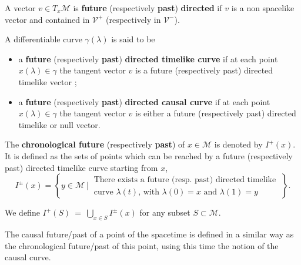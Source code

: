 \documentclass[11pt]{book}
\newcommand{\Mcal}{\mathcal{M}}
\newcommand{\Vcal}{\mathcal{V}}
\theoremstyle{break}
\newtheorem{definition}{Definition}[chapter]
\begin{document}
A vector $v \in T_x\Mcal$ is \textbf{future} (respectively \textbf{past}) \textbf{directed} if $v$ is a non spacelike vector and contained in $\Vcal^+$ (respectively in $\Vcal^-$). 




A differentiable curve $\gamma(\lambda)$ is said to be 
\begin{itemize}
\item a \textbf{future} (respectively \textbf{past}) \textbf{directed timelike curve} if at each point $x(\lambda) \in \gamma$ the tangent vector $v$ is a future (respectively past) directed timelike vector ;
\item a \textbf{future} (respectively \textbf{past}) \textbf{directed causal curve} if at each point $x(\lambda) \in \gamma$ the tangent vector $v$ is either a future (respectively past) directed timelike or null vector. 
\end{itemize}


The \textbf{chronological future} (respectively \textbf{past}) of $x \in \Mcal$ is denoted by $I^{+}(x)$. It is defined as the sets of points which can be reached by a future (respectively past) directed timelike curve starting from $x$,
%
\begin{equation*}
I^{\pm}(x) = \left\{ y \in \Mcal \ \bigg| \ \begin{array}{l} \text{There exists a future (resp. past) directed timelike} \\ \text{curve $\lambda(t)$, with $\lambda(0)=x$ and $\lambda(1)=y$} \end{array} \ \right\}.
\end{equation*}

We define $I^{+}(S) \ = \ \bigcup_{x \in S} I^{\pm}(x)$ for any subset $S \subset \Mcal$.
%


The causal future/past of a point of the spacetime is defined in a similar way as the chronological future/past of this point, using this time the notion of the causal curve.

\end{document}
